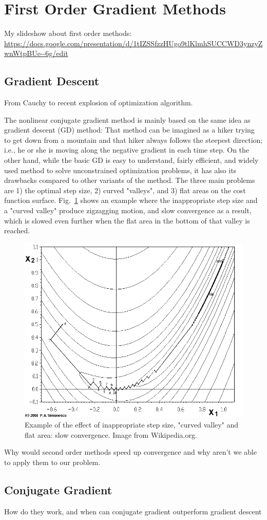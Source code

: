 \section{First Order Gradient Methods}

My slideshow about first order methods: \url{https://docs.google.com/presentation/d/1tIZSSfzzHUgo9tlKlmhSUCCWD3ynzyZwnWtpBUe--6g/edit}

\subsection{Gradient Descent}
From Cauchy to recent explosion of optimization algorithm.

The nonlinear conjugate gradient method is mainly based on the same idea as gradient descent (GD) method: That method can be imagined as a hiker trying to get down from a mountain and that hiker always follows the steepest direction; i.e., he or she is moving along the negative gradient in each time step. On the other hand, while the basic GD is easy to understand, fairly efficient, and widely used method to solve unconstrained optimization problems, it has also its drawbacks compared to other variants of the method. The three main problems are 1) the optimal step size, 2) curved "valleys", and 3) flat areas on the cost function surface. Fig.~\ref{fig:grad_desc_problem} shows an example where the inappropriate step size and a "curved valley" produce zigzagging motion, and slow convergence as a result, which is slowed even further when the flat area in the bottom of that valley is reached.

\begin{figure}
    \centering
    \includegraphics[width=0.3\linewidth]{images/project with Wiem/Banana-SteepDesc.png}
    \caption{Example of the effect of inappropriate step size, "curved valley" and flat area: slow convergence. Image from Wikipedia.org.}
    \label{fig:grad_desc_problem}
\end{figure}

Why would second order methods speed up convergence and why aren't we able to apply them to our problem.

\subsection{Conjugate Gradient}
How do they work, and when can conjugate gradient outperform gradient descent

